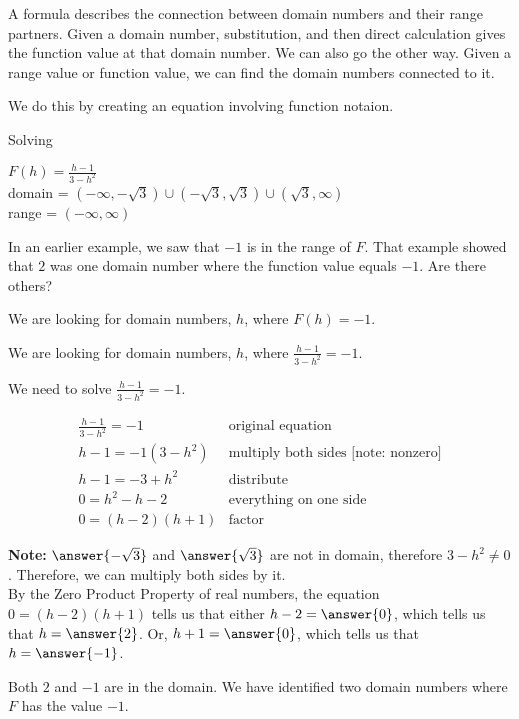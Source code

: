 \documentclass{ximera}
\begin{document}
A formula describes the connection between domain numbers and their range partners.  Given a domain number, substitution, and then direct calculation gives the function value at that domain number.  We can also go the other way.  Given a range value or function value, we can find the domain numbers connected to it.

We do this by creating an equation involving function notaion.
















\begin{example}   Solving 

$F(h) = \frac{h-1}{3-h^2}$ \\
domain = $(-\infty, -\sqrt{3}) \cup (-\sqrt{3}, \sqrt{3}) \cup (\sqrt{3}, \infty)$ \\
range = $(-\infty, \infty)$


In an earlier example, we saw that $-1$ is in the range of $F$.  That example showed that $2$ was one domain number where the function value equals $-1$. Are there others?



\begin{explanation}


We are looking for domain numbers, $h$, where $F(h) = -1$.  

We are looking for domain numbers, $h$, where $\frac{h-1}{3-h^2} = -1$.  

We need to solve $\frac{h-1}{3-h^2} = -1$.



\[
\begin{array}{ll}
\frac{h-1}{3-h^2} = -1 &  \text{original equation} \\
h - 1 = -1 (3-h^2)    &  \text{multiply both sides [note: nonzero]} \\
h - 1 = -3 + h^2    &      \text{distribute} \\
0 = h^2 - h - 2    &      \text{everything on one side} \\
0 =(h-2)(h+1)    &   \text{factor}   
\end{array}
\]



\textbf{Note:}  $\answer{-\sqrt{3}}$ and $\answer{\sqrt{3}}$ are not in domain, therefore $3 - h^2 \ne 0$. Therefore, we can multiply both sides by it.  \\



By the Zero Product Property of real numbers, the equation $0 =(h-2)(h+1)$ tells us that either $h-2 = \answer{0}$, which tells us that $h = \answer{2}$. Or, $h+1 = \answer{0}$, which tells us that $h = \answer{-1}$.

Both $2$ and $-1$ are in the domain.  We have identified two domain numbers where $F$ has the value $-1$.


\end{explanation}
\end{example}
\end{document}
